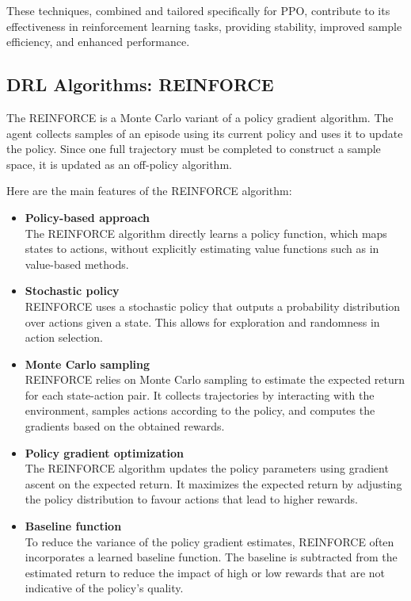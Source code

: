 \begin{textblock}
These techniques, combined and tailored specifically for PPO, contribute to its effectiveness in reinforcement learning tasks, providing stability, improved sample efficiency, and enhanced performance.
\end{textblock}

\subsection{DRL Algorithms: REINFORCE}
\begin{textblock}
The REINFORCE is a Monte Carlo variant of a policy gradient algorithm. The agent collects samples of an episode using its current policy and uses it to update the policy. Since one full trajectory must be completed to construct a sample space, it is updated as an off-policy algorithm.

Here are the main features of the REINFORCE algorithm:
\end{textblock}

\begin{itemize}
    
\item {\bf Policy-based approach}\\
The REINFORCE algorithm directly learns a policy function, which maps states to actions, without explicitly estimating value functions such as in value-based methods.

\item {\bf Stochastic policy}\\
REINFORCE uses a stochastic policy that outputs a probability distribution over actions given a state. This allows for exploration and randomness in action selection.

\item {\bf Monte Carlo sampling}\\
REINFORCE relies on Monte Carlo sampling to estimate the expected return for each state-action pair. It collects trajectories by interacting with the environment, samples actions according to the policy, and computes the gradients based on the obtained rewards.

\item {\bf Policy gradient optimization}\\
The REINFORCE algorithm updates the policy parameters using gradient ascent on the expected return. It maximizes the expected return by adjusting the policy distribution to favour actions that lead to higher rewards.

\item {\bf Baseline function}\\
To reduce the variance of the policy gradient estimates, REINFORCE often incorporates a learned baseline function. The baseline is subtracted from the estimated return to reduce the impact of high or low rewards that are not indicative of the policy's quality.

\end{itemize}


